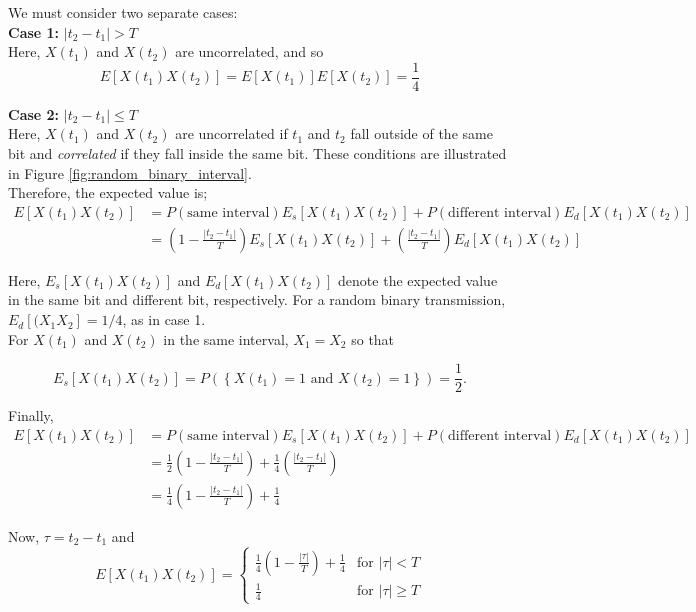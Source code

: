 \documentclass[12pt]{book}
\theoremstyle{definition}
\begin{document}
We must consider two separate cases:\\

\textbf{Case 1:} \( |t_2-t_1|>T\)\\
Here, \(X(t_1)\) and \(X(t_2)\) are uncorrelated, and so
\[
E\left [ X(t_1) X(t_2) \right ] = E\left [ X(t_1) \right ] E\left [X(t_2)\right ] = \frac{1}{4}
\]

\textbf{Case 2:} \( |t_2-t_1|\le T\)\\
Here, \(X(t_1)\) and \(X(t_2)\) are uncorrelated if \(t_1\) and \(t_2\) fall outside of the same bit and \emph{correlated} if they fall inside the same bit. These conditions are  illustrated in Figure \ref{fig:random_binary_interval}.\\

Therefore, the expected value is;
\[
\begin{split}
    E\left [ X(t_1) X(t_2) \right ] & = P(\text{same interval})E_s[X(t_1) X(t_2)] + P(\text{different interval})E_d[X(t_1) X(t_2)]\\
        & = \left ( 1-\frac{|t_2-t_1|}{T} \right)E_s[X(t_1) X(t_2)] + \left (\frac{|t_2-t_1|}{T} \right)E_d[X(t_1) X(t_2)]
\end{split}
\]

Here, \(E_s[X(t_1) X(t_2)]\) and \(E_d[X(t_1) X(t_2)]\) denote the expected value in the same bit and different bit, respectively. For a random binary transmission, \(E_d[(X_1 X_2]=1/4\), as in case 1.\\

For \(X(t_1)\) and \(X(t_2)\) in the same interval, \(X_1=X_2\) so that

\[ 
E_s[X(t_1) X(t_2)] = P(\left \{ X(t_1)=1 \text{ and } X(t_2)=1 \right \}) = \frac{1}{2}.
\]

Finally, 
\[
\begin{split}
    E\left [ X(t_1) X(t_2) \right ] & = P(\text{same interval})E_s[X(t_1) X(t_2)] + P(\text{different interval})E_d[X(t_1) X(t_2)]\\
        & = \frac{1}{2}\left ( 1-\frac{|t_2-t_1|}{T} \right) + \frac{1}{4}\left (\frac{|t_2-t_1|}{T} \right)\\
        & = \frac{1}{4}\left ( 1-\frac{|t_2-t_1|}{T} \right) + \frac{1}{4}
\end{split}
\]

Now, \( \tau = t_2 - t_1\) and
\[ 
E[X(t_1) X(t_2)] = \begin{cases}
\frac{1}{4}\left ( 1-\frac{|\tau|}{T} \right) + \frac{1}{4} & \text{for } |\tau|<T \\
\frac{1}{4} & \text{for } |\tau| \ge T
\end{cases}
\]
\end{document}

